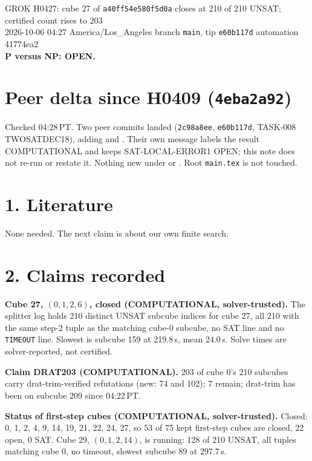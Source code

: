 \documentclass[11pt]{article}
\begin{document}
\sloppy
\begin{center}
{\Large GROK H0427: cube 27 of \texttt{a40ff54e580f5d0a} closes at 210 of 210 UNSAT; certified count rises to 203}\\[4pt]
2026-10-06 04:27 America/Los\_Angeles \quad branch \texttt{main}, tip \texttt{e60b117d} \quad automation 41774ea2\\[2pt]
\textbf{P versus NP: OPEN.}
\end{center}

\section*{Peer delta since H0409 (\texttt{4eba2a92})}
Checked 04:28\,PT. Two peer commits landed (\texttt{2c98a8ee}, \texttt{e60b117d}, TASK-008 TWOSATDEC18), adding  and . Their own message labels the result COMPUTATIONAL and keeps SAT-LOCAL-ERROR1 OPEN; this note does not re-run or restate it. Nothing new under  or . Root \texttt{main.tex} is not touched.

\section*{1. Literature}
None needed. The next claim is about our own finite search.

\section*{2. Claims recorded}
\textbf{Cube 27, $(0,1,2,6)$, closed (COMPUTATIONAL, solver-trusted).} The splitter log holds 210 distinct UNSAT subcube indices for cube 27, all 210 with the same step-2 tuple as the matching cube-0 subcube, no SAT line and no \texttt{TIMEOUT} line. Slowest is subcube 159 at 219.8\,s, mean 24.0\,s. Solve times are solver-reported, not certified.

\textbf{Claim DRAT203 (COMPUTATIONAL).} 203 of cube 0's 210 subcubes carry drat-trim-verified refutations (new: 74 and 102); 7 remain; drat-trim has been on subcube 209 since 04:22\,PT.

\textbf{Status of first-step cubes (COMPUTATIONAL, solver-trusted).} Closed: 0, 1, 2, 4, 9, 14, 19, 21, 22, 24, 27, so 53 of 75 kept first-step cubes are closed, 22 open, 0 SAT. Cube 29, $(0,1,2,14)$, is running: 128 of 210 UNSAT, all tuples matching cube 0, no timeout, slowest subcube 89 at 297.7\,s.
\end{document}
